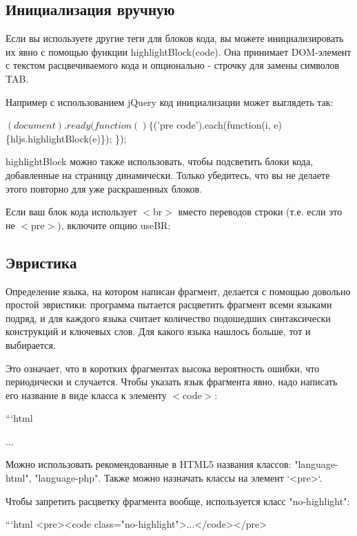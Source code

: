 \subsection*{Инициализация вручную}

Если вы используете другие теги для блоков кода, вы можете инициализировать их явно с помощью функции {\ttfamily highlight\+Block(code)}. Она принимает D\+O\+M-\/элемент с текстом расцвечиваемого кода и опционально -\/ строчку для замены символов T\+AB.

Например с использованием j\+Query код инициализации может выглядеть так\+:


\begin{DoxyCode}
$(document).ready(function() \{
  $('pre code').each(function(i, e) \{hljs.highlightBlock(e)\});
\});
\end{DoxyCode}


{\ttfamily highlight\+Block} можно также использовать, чтобы подсветить блоки кода, добавленные на страницу динамически. Только убедитесь, что вы не делаете этого повторно для уже раскрашенных блоков.

Если ваш блок кода использует {\ttfamily $<$br$>$} вместо переводов строки (т.\+е. если это не {\ttfamily $<$pre$>$}), включите опцию {\ttfamily use\+BR}\+:




\subsection*{Эвристика}

Определение языка, на котором написан фрагмент, делается с помощью довольно простой эвристики\+: программа пытается расцветить фрагмент всеми языками подряд, и для каждого языка считает количество подошедших синтаксически конструкций и ключевых слов. Для какого языка нашлось больше, тот и выбирается.

Это означает, что в коротких фрагментах высока вероятность ошибки, что периодически и случается. Чтобы указать язык фрагмента явно, надо написать его название в виде класса к элементу {\ttfamily $<$code$>$}\+:

```html 
\begin{DoxyPre}{\ttfamily ...}\end{DoxyPre}
 
\begin{DoxyCode}
Можно использовать рекомендованные в HTML5 названия классов:
"language-html", "language-php". Также можно назначать классы на элемент
`<pre>`.

Чтобы запретить расцветку фрагмента вообще, используется класс "no-highlight":

```html
<pre><code class="no-highlight">...</code></pre>
\end{DoxyCode}


